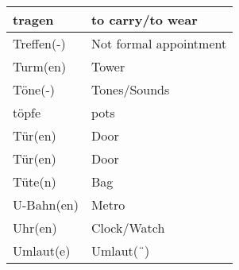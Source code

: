 \documentclass{article}
\begin{document}
\begin{minipage}{0.48\textwidth}
\begin{tabular}{|>{\raggedright\arraybackslash}p{3.5cm}|>{\raggedright\arraybackslash}p{3.5cm}|}
        tragen & to carry/to wear \\\hline
        Treffen(-) & Not formal appointment \\\hline
        Turm(en) & Tower \\\hline
        Töne(-) & Tones/Sounds \\\hline
        töpfe & pots \\\hline
        Tür(en) & Door \\\hline
        Tür(en) & Door \\\hline
        Tüte(n) & Bag \\\hline
        U-Bahn(en) & Metro \\\hline
        Uhr(en) & Clock/Watch \\\hline
        Umlaut(e) & Umlaut(¨) \\\hline
    \end{tabular}
\end{minipage}

\newpage
\end{document}
